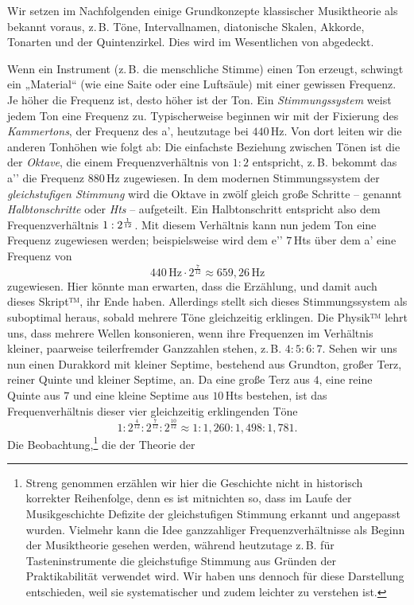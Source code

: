 Wir setzen im Nachfolgenden einige Grundkonzepte klassischer Musiktheorie als
bekannt voraus, z.\,B. Töne, Intervallnamen, diatonische Skalen, Akkorde,
Tonarten und der Quintenzirkel. Dies wird im Wesentlichen von
\cite[§\,1–6]{Skript} abgedeckt.

Wenn ein Instrument (z.\,B. die menschliche Stimme) einen Ton erzeugt, schwingt
ein „Material“ (wie eine Saite oder eine Luftsäule) mit einer gewissen Frequenz.
Je höher die Frequenz ist, desto höher ist der Ton. Ein \emph{Stimmungssystem}
weist jedem Ton eine Frequenz zu. Typischerweise beginnen wir mit der Fixierung
des \emph{Kammertons}, der Frequenz des a’, heutzutage bei $440$\,Hz. Von dort
leiten wir die anderen Tonhöhen wie folgt ab: Die einfachste Beziehung zwischen
Tönen ist die der \emph{Oktave}, die einem Frequenzverhältnis von $1:2$
entspricht, z.\,B. bekommt das a’’ die Frequenz $880$\,Hz zugewiesen. In dem
modernen Stimmungssystem der \emph{gleichstufigen Stimmung} wird die Oktave in
zwölf gleich große Schritte – genannt \emph{Halbtonschritte} oder \emph{Hts} – 
aufgeteilt. Ein Halbtonschritt entspricht also dem Frequenzverhältnis
$1:2^{\smash{\frac1{12}}}$. Mit diesem Verhältnis kann nun jedem Ton eine
Frequenz zugewiesen werden; beispielsweise wird dem e’’ $7$\,Hts
über dem a’ eine Frequenz von 
\[440\,\text{Hz}\cdot 2^{\frac7{12}} \approx 659{,}26\,\text{Hz}\]%
zugewiesen. Hier könnte man erwarten, dass die Erzählung, und damit auch dieses
Skript™, ihr Ende haben. Allerdings stellt sich dieses Stimmungssystem als
suboptimal heraus, sobald mehrere Töne gleichzeitig erklingen. Die Physik™ lehrt
uns, dass mehrere Wellen konsonieren, wenn ihre Frequenzen im Verhältnis
kleiner, paarweise teilerfremder Ganzzahlen stehen, z.\,B. $4:5:6:7$. Sehen wir
uns nun einen Durakkord mit kleiner Septime, bestehend aus Grundton, großer
Terz, reiner Quinte und kleiner Septime, an. Da eine große Terz aus $4$, eine
reine Quinte aus $7$ und eine kleine Septime aus $10$\,Hts bestehen,
ist das Frequenverhältnis dieser vier gleichzeitig erklingenden Töne
%
\[1:2^{\frac4{12}}:2^{\frac7{12}}:2^{\frac{10}{12}}\approx
  1:1{,}260:1{,}498:1{,}781.\]%
Die Beobachtung,\footnote{Streng genommen erzählen wir hier die Geschichte nicht
  in historisch korrekter Reihenfolge, denn es ist mitnichten so, dass im Laufe
  der Musikgeschichte Defizite der gleichstufigen Stimmung erkannt und angepasst
  wurden. Vielmehr kann die Idee ganzzahliger Frequenzverhältnisse als Beginn
  der Musiktheorie gesehen werden, während heutzutage z.\,B. für
  Tasteninstrumente die gleichstufige Stimmung aus Gründen der Praktikabilität
  verwendet wird. Wir haben uns dennoch für diese Darstellung entschieden, weil
  sie systematischer und zudem leichter zu verstehen ist.} die der Theorie der
